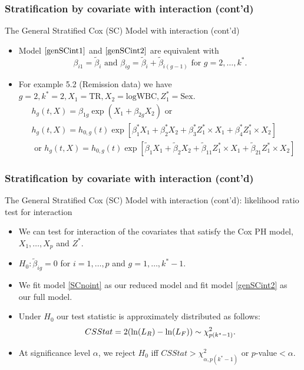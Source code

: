 \documentclass{beamer}
\theoremstyle{definition}
\begin{document}
\begin{frame}
\frametitle{Stratification by covariate with interaction (cont'd)}
\begin{block}{The General Stratified Cox (SC) Model with interaction (cont'd)}
\begin{itemize}
\item Model $\ref{genSCint1}$ and $\ref{genSCint2}$ are equivalent with 
\[ \beta_{i1} = \tilde{\beta}_i \text{ and } \beta_{ig} = \tilde{\beta}_{i} + \tilde{\beta}_{i(g-1)} \text{ for } g=2,\ldots,k^*.
\]
\item For example 5.2 (Remission data) we have $g=2, k^*=2, X_1=\text{TR}, X_2=\text{logWBC}, Z_1^*=\text{Sex}$. 
\begin{align*}
&h_g(t,X) = \beta_{1g} \exp( X_1 + \beta_{2g} X_2)  \text{ or } \\
&h_g(t,X) = h_{0,g}(t)\exp[\beta_1^*X_1  + \beta_2^*X_2 + \beta_3^*Z_1^*\times X_1 + \beta_4^*Z_1^*\times X_2 ]  \\
&\text{ or } h_g(t,X) = h_{0,g}(t)\exp[\tilde{\beta}_1X_1  + \tilde{\beta}_2X_2 + \tilde{\beta}_{11}Z_1^*\times X_1 + \tilde{\beta}_{21}Z_1^*\times X_2 ] 
\end{align*} 
\end{itemize}
\end{block}
\end{frame}  

\begin{frame}
\frametitle{Stratification by covariate with interaction (cont'd)}
\begin{block}{The General Stratified Cox (SC) Model with interaction (cont'd): likelihood ratio test for interaction}
\begin{itemize}
\item We can test for interaction of the covariates that satisfy the Cox PH model, $X_1,\ldots,X_p$ and $Z^*$. 
\item $H_0: \tilde{\beta}_{ig} =0$ for $i=1,\ldots,p$ and $g=1,\ldots,k^*-1$.  
\item We fit model \ref{SCnoint} as our reduced model and fit model \ref{genSCint2} as our full model. 
\item Under $H_0$ our test statistic is approximately distributed as follows:
\[
CSStat= \-2(\ln(L_R) - \ln(L_F)) \sim \chi^2_{p(k^*-1)}. 
\]
\item At significance level $\alpha$, we reject $H_0$  iff $CSStat>\chi^2_{\alpha,p(k^*-1)}$ or $p$-value$<\alpha$. 
\end{itemize} 
\end{block} 
\end{frame}  
\end{document}
